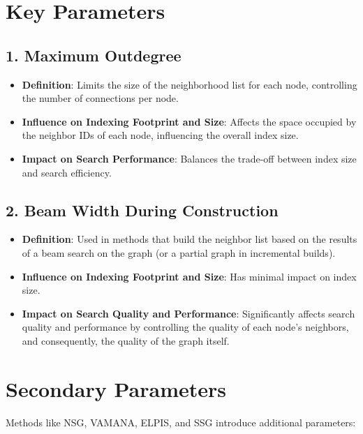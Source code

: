 \section*{Key Parameters}

\subsection*{1. Maximum Outdegree}

\begin{itemize}
    \item \textbf{Definition}: Limits the size of the neighborhood list for each node, controlling the number of connections per node.
    \item \textbf{Influence on Indexing Footprint and Size}: Affects the space occupied by the neighbor IDs of each node, influencing the overall index size.
    \item \textbf{Impact on Search Performance}: Balances the trade-off between index size and search efficiency.
\end{itemize}

\subsection*{2. Beam Width During Construction}

\begin{itemize}
    \item \textbf{Definition}: Used in methods that build the neighbor list based on the results of a beam search on the graph (or a partial graph in incremental builds).
    \item \textbf{Influence on Indexing Footprint and Size}: Has minimal impact on index size.
    \item \textbf{Impact on Search Quality and Performance}: Significantly affects search quality and performance by controlling the quality of each node's neighbors, and consequently, the quality of the graph itself.
\end{itemize}

\section*{Secondary Parameters}

Methods like NSG, VAMANA, ELPIS, and SSG introduce additional parameters:


